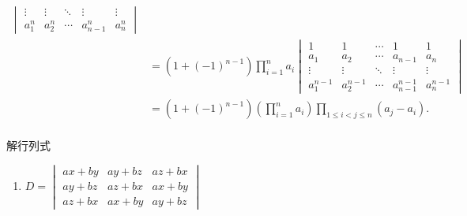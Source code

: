 \begin{exercise}
\begin{exgroup}
\begin{answer}
\begin{align*}
\begin{vmatrix}
                                                \vdots    & \vdots    & \ddots & \vdots      & \vdots    \\
                                                a_{1}^{n} & a_{2}^{n} & \cdots & a_{n-1}^{n} & a_{n}^{n}
                                            \end{vmatrix}                \\
                            & =(1+(-1)^{n-1})\prod_{i=1}^na_i
                \begin{vmatrix}
                    1           & 1           & \cdots & 1             & 1           \\
                    a_{1}       & a_{2}       & \cdots & a_{n-1}       & a_{n}       \\
                    \vdots      & \vdots      & \ddots & \vdots        & \vdots      \\
                    a_{1}^{n-1} & a_{2}^{n-1} & \cdots & a_{n-1}^{n-1} & a_{n}^{n-1}
                \end{vmatrix}                                     \\
                            & =(1+(-1)^{n-1})\left(\prod_{i=1}^na_i\right)\prod_{1\leqslant i<j\leqslant n}(a_j-a_i). \\
            \end{align*}
        \end{answer}

        \item 解行列式
        \begin{multicols}{2} \begin{enumerate}
                \item $D=\begin{vmatrix}
                              ax+by & ay+bz & az+bx \\
                              ay+bz & az+bx & ax+by \\
                              az+bx & ax+by & ay+bz
                          \end{vmatrix}$


\end{enumerate}
\end{multicols}
\end{exgroup}
\end{exercise}
